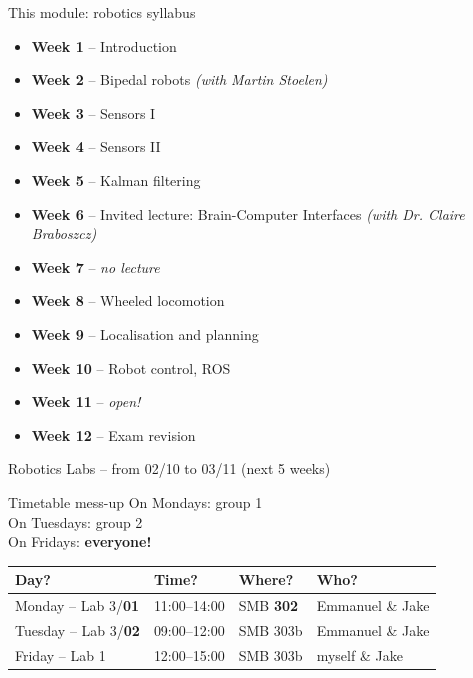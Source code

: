 \documentclass[compress]{beamer}
\begin{document}
\begin{frame}{This module: robotics syllabus}

\begin{itemize}
    \item<+-> \textbf{Week 1} -- Introduction
    \item<+-> \textbf{Week 2} -- Bipedal robots \emph{(with Martin Stoelen)}
    \item<+-> \textbf{Week 3} -- Sensors I
    \item<+-> \textbf{Week 4} -- Sensors II
    \item<+-> \textbf{Week 5} -- Kalman filtering
    \item<+-> \textbf{Week 6} -- Invited lecture: Brain-Computer Interfaces \emph{(with Dr. Claire Braboszcz)}
    \item<+-> \textbf{Week 7} -- \emph{no lecture}
    \item<+-> \textbf{Week 8} -- Wheeled locomotion
    \item<+-> \textbf{Week 9} -- Localisation and planning
    \item<+-> \textbf{Week 10} -- Robot control, ROS
    \item<+-> \textbf{Week 11} -- \emph{open!}
    \item<+-> \textbf{Week 12} -- Exam revision
\end{itemize}

\end{frame}


\begin{frame}{Robotics Labs -- from 02/10 to 03/11 (next 5 weeks)}
    \begin{alertblock}{Timetable mess-up}
        On Mondays: group 1 \\
        On Tuesdays: group 2 \\
        On Fridays: \textbf{everyone!}
    \end{alertblock}

          \begin{tabular}{@{}llll@{}}
                \toprule
                Day?                & Time? & Where?   & Who? \\ \midrule
                Monday -- Lab 3/\textbf{01} & 11:00--14:00     & SMB \textbf{302}  & Emmanuel \& Jake            \\
                Tuesday -- Lab 3/\textbf{02} & 09:00--12:00     & SMB 303b  & Emmanuel \& Jake          \\ \midrule
                Friday -- Lab 1 & 12:00--15:00     & SMB 303b  & myself \& Jake          \\ \bottomrule
            \end{tabular}


\end{frame}
\end{document}

